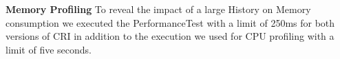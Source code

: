 	\textbf{Memory Profiling}
	To reveal the impact of a large History on Memory consumption we executed the PerformanceTest with a limit of 250ms for both versions of CRI in addition to the execution we used for CPU profiling with a limit of five seconds.
	
	\begin{figure}[!h]
		\centering
		\hfill

\end{figure}
